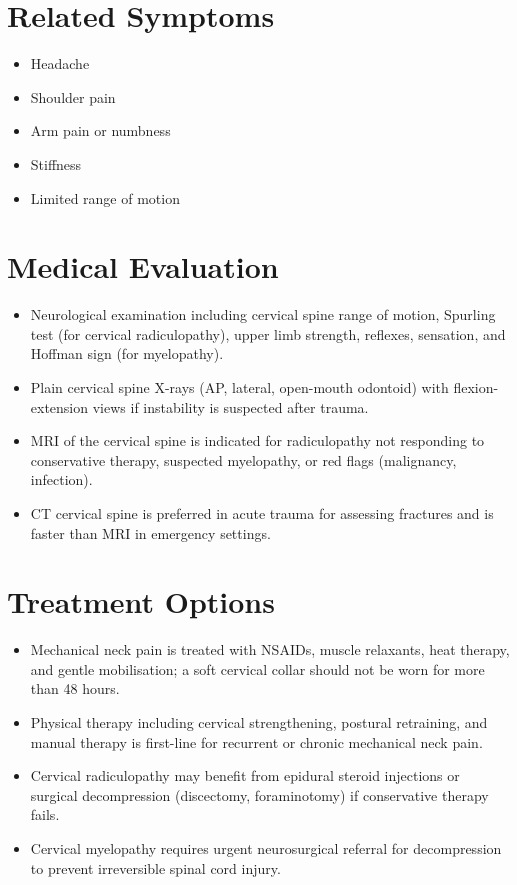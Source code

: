 \section*{Related Symptoms}
\begin{itemize}
  \item Headache
  \item Shoulder pain
  \item Arm pain or numbness
  \item Stiffness
  \item Limited range of motion
\end{itemize}


\section*{Medical Evaluation}
\begin{itemize}
  \item Neurological examination including cervical spine range of motion, Spurling test (for cervical radiculopathy), upper limb strength, reflexes, sensation, and Hoffman sign (for myelopathy).
  \item Plain cervical spine X-rays (AP, lateral, open-mouth odontoid) with flexion-extension views if instability is suspected after trauma.
  \item MRI of the cervical spine is indicated for radiculopathy not responding to conservative therapy, suspected myelopathy, or red flags (malignancy, infection).
  \item CT cervical spine is preferred in acute trauma for assessing fractures and is faster than MRI in emergency settings.
\end{itemize}

\section*{Treatment Options}
\begin{itemize}
  \item Mechanical neck pain is treated with NSAIDs, muscle relaxants, heat therapy, and gentle mobilisation; a soft cervical collar should not be worn for more than 48 hours.
  \item Physical therapy including cervical strengthening, postural retraining, and manual therapy is first-line for recurrent or chronic mechanical neck pain.
  \item Cervical radiculopathy may benefit from epidural steroid injections or surgical decompression (discectomy, foraminotomy) if conservative therapy fails.
  \item Cervical myelopathy requires urgent neurosurgical referral for decompression to prevent irreversible spinal cord injury.
\end{itemize}

